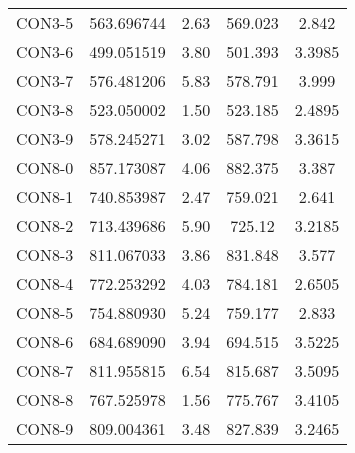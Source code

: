 \begin{table}[ht]
\begin{tabular}{c c c c c}
CON3-5 & 563.696744 & 2.63 & 569.023 & 2.842 \\
CON3-6 & 499.051519 & 3.80 & 501.393 & 3.3985 \\
CON3-7 & 576.481206 & 5.83 & 578.791 & 3.999 \\
CON3-8 & 523.050002 & 1.50 & 523.185 & 2.4895 \\
CON3-9 & 578.245271 & 3.02 & 587.798 & 3.3615 \\
CON8-0 & 857.173087 & 4.06 & 882.375 & 3.387 \\
CON8-1 & 740.853987 & 2.47 & 759.021 & 2.641 \\
CON8-2 & 713.439686 & 5.90 & 725.12 & 3.2185 \\
CON8-3 & 811.067033 & 3.86 & 831.848 & 3.577 \\
CON8-4 & 772.253292 & 4.03 & 784.181 & 2.6505 \\
CON8-5 & 754.880930 & 5.24 & 759.177 & 2.833 \\
CON8-6 & 684.689090 & 3.94 & 694.515 & 3.5225 \\
CON8-7 & 811.955815 & 6.54 & 815.687 & 3.5095 \\
CON8-8 & 767.525978 & 1.56 & 775.767 & 3.4105 \\
CON8-9 & 809.004361 & 3.48 & 827.839 & 3.2465 \\
[1ex]\hline
\end{tabular}
\label{table:nonlin}
\end{table} \clearpage
